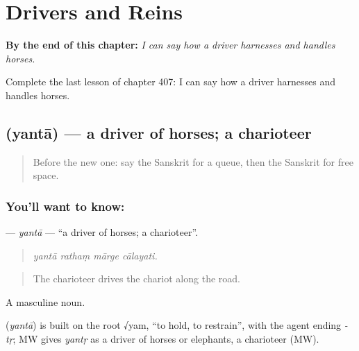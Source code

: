 
\chapter{Drivers and Reins}
\label{ch:sa-drivers-and-reins}

\begin{chapteropening}
\textbf{By the end of this chapter:} \emph{I can say how a driver harnesses and handles horses.}

Complete the last lesson of chapter 407: I can say how a driver harnesses and handles horses.
\end{chapteropening}

\section[\texorpdfstring{\sk{यन्ता} (yantā)}{यन्ता (yantā)}]{ (yantā) — a driver of horses; a charioteer}

\label{lesson:SA-C407-yanta}



\begin{quote}
Before the new one: say the Sanskrit for a queue, then the Sanskrit for free space.
\end{quote}

\subsection*{You'll want to know: }
\textbf{} — \emph{yantā} — \textquotedblleft{}a driver of horses; a charioteer\textquotedblright{}.

\begin{quote}
   
\end{quote}

\begin{quote}
\emph{yantā rathaṃ mārge cālayati.}
\end{quote}

\begin{quote}
The charioteer drives the chariot along the road.
\end{quote}

A masculine noun.

\begin{cousinweb}
\textbf{} (\emph{yantā}) is built on the root √yam, \textquotedblleft{}to hold, to restrain\textquotedblright{}, with the agent ending \emph{-tṛ}; MW gives \emph{yantṛ} as a driver of horses or elephants, a charioteer (MW).
\end{cousinweb}

